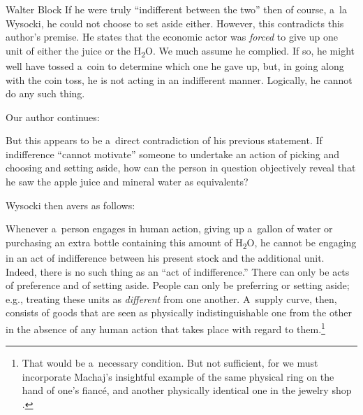 \begin{artengenv}{Walter Block}
If he were truly ``indifferent between the two'' then of course, a~la Wysocki, he could not choose to set aside either. However, this contradicts this author's premise. He states that the economic actor was \textit{forced} to give up one unit of either the juice or the H\textsubscript{2}O. We much assume he complied. If so, he might well have tossed a~coin to determine which one he gave up, but, in going along with the coin toss, he is not acting in an indifferent manner. Logically, he cannot do any such thing.

Our author continues:

But this appears to be a~direct contradiction of his previous statement. If indifference ``cannot motivate'' someone to undertake an action of picking and choosing and setting aside, how can the person in question objectively reveal that he saw the apple juice and mineral water as equivalents?

Wysocki then avers as follows:


Whenever a~person engages in human action, giving up a~gallon of water or purchasing an extra bottle containing this amount of H\textsubscript{2}O, he cannot be engaging in an act of indifference between his present stock and the additional unit. Indeed, there is no such thing as an ``act of indifference.'' There can only be acts of preference and of setting aside. People can only be preferring or setting aside; e.g., treating these units as \textit{different} from one another. A~supply curve, then, consists of goods that are seen as physically indistinguishable one from the other in the absence of any human action that takes place with regard to them.\footnote{That would be a~necessary condition. But not sufficient, for we must incorporate Machaj's
\parencite*[][]{machaj_praxeological_2007} %
 insightful example of the same physical ring on the hand of one's fiancé, and another physically identical one in the jewelry shop   
\parencites[see][]{block_rejoinder_2009-1}[also][]{block_response_2012}.%
}


\end{artengenv}
